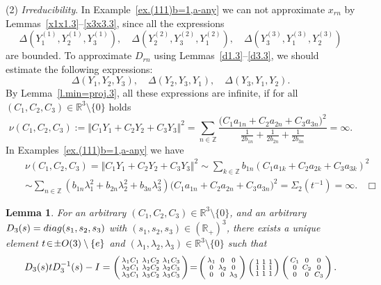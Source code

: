 \documentclass[preprint,12pt]{elsarticle}
\newtheorem{lem}[thm]{Lemma}
\numberwithin{equation}{section}
\begin{document}
\begin{pf}
(2) {\it Irreducibility}.  In Example~\ref{ex.(111)b=1,a-any} we can not approximate  $x_{rn}$ by  Lemmas~\ref{x1x1.3}--\ref{x3x3.3}, since all the expressions
$$
\Delta(Y_1^{(1)},Y_2^{(1)},Y_3^{(1)}),\quad \Delta(Y_2^{(2)},Y_3^{(2)},Y_1^{(2)}),\quad \Delta(Y_3^{(3)},Y_1^{(3)},Y_2^{(3)})
$$
are bounded.
To approximate $D_{rn}$ using  Lemmas~\ref{d1.3}--\ref{d3.3},
we should estimate the following expressions:
 $$
 \Delta(Y_1,Y_2,Y_3),\quad \Delta(Y_2,Y_3,Y_1),\quad \Delta(Y_3,Y_1,Y_2).
 $$ 
By Lemma~\ref{l.min=proj.3},
 all these expressions  are infinite, if for all $(C_1,C_2,C_3)\in 
 {\mathbb R}^3\setminus\{0\}$  holds
\begin{equation*}
\nu( C_1, C_2, C_3):=\Vert C_1Y_1+C_2Y_2+C_3Y_3\Vert^2\!=\!\sum_{n\in \mathbb Z}\!\frac{\Big(\!C_1a_{1n}\!+\!C_2a_{2n}\!+\!C_3a_{3n}\!\Big)^2}
{\frac{1}{2b_{1n}}+\frac{1}{2b_{2n}}+\frac{1}{2b_{3n}}}=\infty.
\end{equation*}
In  Examples~\ref{ex.(111)b=1,a-any} we have 
\begin{eqnarray*}
&&
\nu( C_1, C_2, C_3)
\!=\!\Vert C_1Y_1+ C_2Y_2+C_3Y_3\Vert^2\!\sim\!
\sum_{k\in \mathbb Z}b_{1n}(C_1a_{1k}+ C_2a_{2k}+C_3a_{3k})^2\\
&&
\sim\sum_{n\in{\mathbb Z}}(b_{1n}\lambda_1^2+b_{2n}\lambda_2^2+b_{3n}\lambda_3^2)\big(C_1a_{1n}+C_2a_{2n}+C_3a_{3n}\big)^2\!=\!\Sigma_2(t^{-1})=\infty.\,\,\,\,\,\Box
\end{eqnarray*}
\end{pf}
%
\begin{lem}
\label{l.DtD=C.m=3}
For an arbitrary $(C_1,C_2,C_3)\in {\mathbb R}^3\setminus\{0\}$,  and  an arbitrary $D_3(s)={\rm diag}(s_1,s_2,s_3)$ with $(s_1,s_2,s_3)\in ({\mathbb R_+})^3$, 
there exists a unique  element $t\!\in \!\pm {\rm O}(3)\setminus\{e\}$  and $(\lambda_1,\lambda_2,\lambda_3)\in {\mathbb R}^3\setminus\{0\}$
such that 
\begin{equation}
\label{D_3tD^{-1}_3=(1,1,1)}
D_3(s)tD^{-1}_3(s)-{\rm I}=\left(\begin{smallmatrix}
\lambda_1C_1 &\lambda_1C_2 &\lambda_1C_3 \\
\lambda_2C_1 &\lambda_2C_2 &\lambda_2C_3 \\
\lambda_3C_1 &\lambda_3C_2 &\lambda_3C_3
\end{smallmatrix}
\right)\!=\!
%
{\small
\left(\begin{smallmatrix}
\lambda_1&0&0 \\
0&\lambda_2 &0\\ 0&0&\lambda_3
\end{smallmatrix}
\right)
\left(\begin{smallmatrix}
1&1&1 \\
1&1&1\\ 
1&1&1
\end{smallmatrix}
\right)
\left(\begin{smallmatrix}
C_1&0&0 \\
0&C_2 &0\\ 
0&0&C_3
\end{smallmatrix}
\right).
}
\end{equation}
\end{lem}
\end{document}
